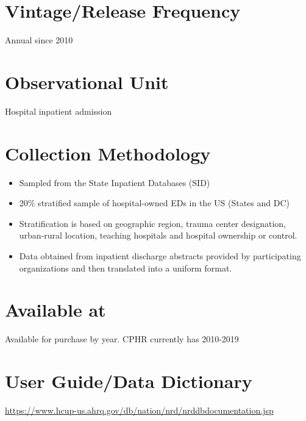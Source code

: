 \documentclass[
]{book}
\providecommand{\tightlist}{%
  \setlength{\itemsep}{0pt}\setlength{\parskip}{0pt}}
\begin{document}
\hypertarget{vintagerelease-frequency-71}{%
\section{Vintage/Release Frequency}\label{vintagerelease-frequency-71}}

Annual since 2010

\hypertarget{observational-unit-71}{%
\section{Observational Unit}\label{observational-unit-71}}

Hospital inpatient admission

\hypertarget{collection-methodology-71}{%
\section{Collection Methodology}\label{collection-methodology-71}}

\begin{itemize}
\tightlist
\item
  Sampled from the State Inpatient Databases (SID)
\item
  20\% stratified sample of hospital-owned EDs in the US (States and DC)
\item
  Stratification is based on geographic region, trauma center designation, urban-rural location, teaching hospitals and hospital ownership or control.
\item
  Data obtained from inpatient discharge abstracts provided by participating organizations and then translated into a uniform format.
\end{itemize}

\hypertarget{available-at-71}{%
\section{Available at}\label{available-at-71}}

Available for purchase by year. CPHR currently has 2010-2019

\hypertarget{user-guidedata-dictionary-71}{%
\section{User Guide/Data Dictionary}\label{user-guidedata-dictionary-71}}

\url{https://www.hcup-us.ahrq.gov/db/nation/nrd/nrddbdocumentation.jsp}
\end{document}
